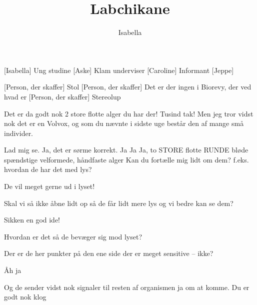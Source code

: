 \documentclass[a4paper,11pt]{article}
\title{Labchikane}
\author{Isabella}
\begin{document}
\maketitle

\begin{roles}
    [Isabella] Ung studine
    [Aske] Klam underviser
    [Caroline] Informant
    [Jeppe]
\end{roles}

\begin{props}
    [Person, der skaffer] Stol
    [Person, der skaffer] Det er der ingen i Biorevy, der ved hvad er
    [Person, der skaffer] Stereolup
\end{props}


\begin{sketch}



 Det er da godt nok 2 store flotte alger du har der!
 Tusind tak! Men jeg tror vidst nok det er en Volvox, og som du nævnte i sidste uge består den af mange små individer.

 Lad mig se.
 Ja, det er sørme korrekt.
 Ja Ja Ja, to STORE flotte RUNDE bløde spændstige velformede, håndfaste alger Kan du fortælle mig lidt om dem? f.eks. hvordan de har det med lys? 

 De vil meget gerne ud i lyset!

 Skal vi så ikke åbne lidt op så de får lidt mere lys og vi bedre kan se dem?

 Sikken en god ide!

 Hvordan er det så de bevæger sig mod lyset?

 Der er de her punkter på den ene side der er meget sensitive -- ikke?

 Åh ja

 Og de sender vidst nok signaler til resten af organismen 
 ja om at komme. Du er godt nok klog


\end{sketch}
\end{document}

